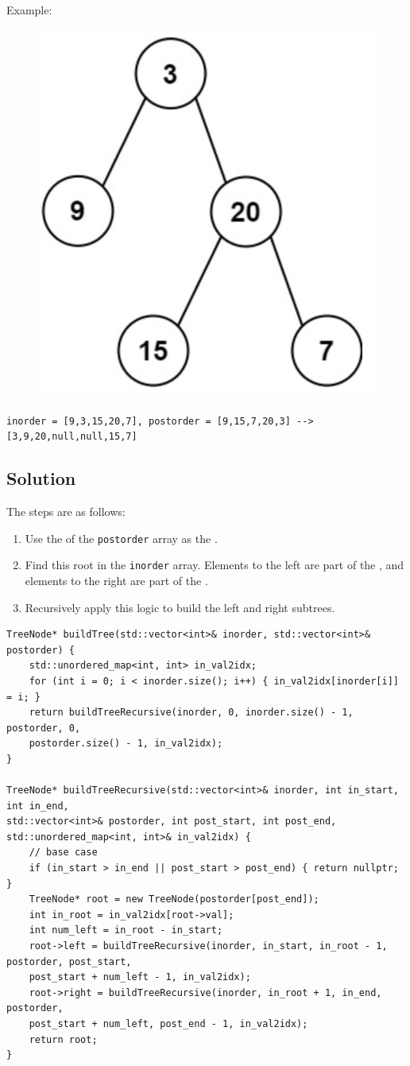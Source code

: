Example:
\begin{figure}[H]
	\centering
	\includegraphics[width=0.23\linewidth]{images/lc0105_example}
	\label{fig:lc0106example}
\end{figure}
{\colorbox{CodeBackground}{\lstinline|inorder = [9,3,15,20,7], postorder = [9,15,7,20,3] --> [3,9,20,null,null,15,7]|}}

\subsection*{Solution}
The steps are as follows:
\begin{enumerate}
	\item Use the {\color{blue}{last element}} of the {\colorbox{CodeBackground}{\lstinline|postorder|}} array as the {\color{blue}{root}}.
	\item Find this root in the {\colorbox{CodeBackground}{\lstinline|inorder|}} array. Elements to the left are part of the {\color{blue}{left subtree}}, and elements to the right are part of the {\color{blue}{right subtree}}.
	\item Recursively apply this logic to build the left and right subtrees.
\end{enumerate}

\begin{lstlisting}
TreeNode* buildTree(std::vector<int>& inorder, std::vector<int>& postorder) {
	std::unordered_map<int, int> in_val2idx;
	for (int i = 0; i < inorder.size(); i++) { in_val2idx[inorder[i]] = i; }
	return buildTreeRecursive(inorder, 0, inorder.size() - 1, postorder, 0,
	postorder.size() - 1, in_val2idx);
}

TreeNode* buildTreeRecursive(std::vector<int>& inorder, int in_start, int in_end,
std::vector<int>& postorder, int post_start, int post_end,
std::unordered_map<int, int>& in_val2idx) {
	// base case
	if (in_start > in_end || post_start > post_end) { return nullptr; }
	TreeNode* root = new TreeNode(postorder[post_end]);
	int in_root = in_val2idx[root->val];
	int num_left = in_root - in_start;
	root->left = buildTreeRecursive(inorder, in_start, in_root - 1, postorder, post_start,
	post_start + num_left - 1, in_val2idx);
	root->right = buildTreeRecursive(inorder, in_root + 1, in_end, postorder, 
	post_start + num_left, post_end - 1, in_val2idx);
	return root;
}
\end{lstlisting}

